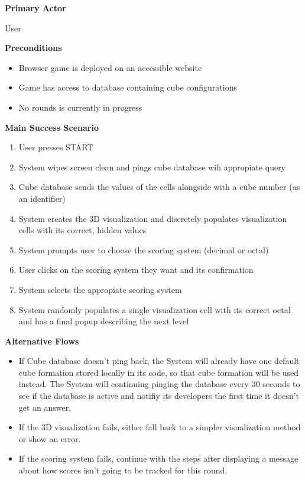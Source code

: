 \documentclass[12pt]{article}
\begin{document}
\textbf{Primary Actor}

User

\textbf{Preconditions}
\begin{itemize}
\item Browser game is deployed on an accessible website
\item Game has access to database containing cube configurations
\item No rounds is currently in progress
\end{itemize}

\textbf{Main Success Scenario}
\begin{enumerate}
\item User presses START
\item System wipes screen clean and pings cube database wih appropiate query
\item Cube database sends the values of the cells alongside with a cube number (as an identifier)
\item System creates the 3D visualization and discretely populates visualization cells with its correct, hidden values
\item System prompts user to choose the scoring system (decimal or octal)
\item User clicks on the scoring system they want and its confirmation
\item System selects the appropiate scoring system
\item System randomly populates a single visualization cell with its correct octal and has a final popup describing the next level
\end{enumerate}

\textbf{Alternative Flows}
\begin{itemize}
\item If Cube database doesn't ping back, the System will already have one default cube formation stored locally in its code, so that cube formation will be used instead. 
The System will continuing pinging the database every 30 seconds to see if the database is active and notifiy its developers the first time it doesn't get an answer.
\item If the 3D visualization fails, either fall back to a simpler visualization method or show an error.
\item If the scoring system fails, continue with the steps after displaying a message about how scores isn't going to be tracked for this round.
\end{itemize}
\end{document}
